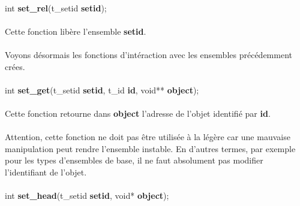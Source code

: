 \documentclass[10pt,a4wide]{article}
\begin{document}
\paragraph{}

\hspace{1.5cm}int \textbf{set\_rel}(t\_setid \textbf{setid});

\paragraph{}

Cette fonction lib\`ere l'ensemble \textbf{setid}.

\paragraph{}

Voyons d\'esormais les fonctions d'int\'eraction avec les ensembles
pr\'ec\'edemment cr\'ees.

\paragraph{}

\hspace{1.5cm}int \textbf{set\_get}(t\_setid \textbf{setid},
                                    t\_id \textbf{id},
                                    void** \textbf{object});

\paragraph{}

Cette fonction retourne dans \textbf{object} l'adresse de l'objet
identifi\'e par \textbf{id}.

\paragraph{}

Attention, cette fonction ne doit pas \^etre utilis\'ee \`a la l\'eg\`ere
car une mauvaise manipulation peut rendre l'ensemble instable. En d'autres
termes, par exemple pour les types d'ensembles de base, il ne faut
absolument pas modifier l'identifiant de l'objet.

\paragraph{}

\hspace{1.5cm}int \textbf{set\_head}(t\_setid \textbf{setid},
                                     void* \textbf{object});
\end{document}
